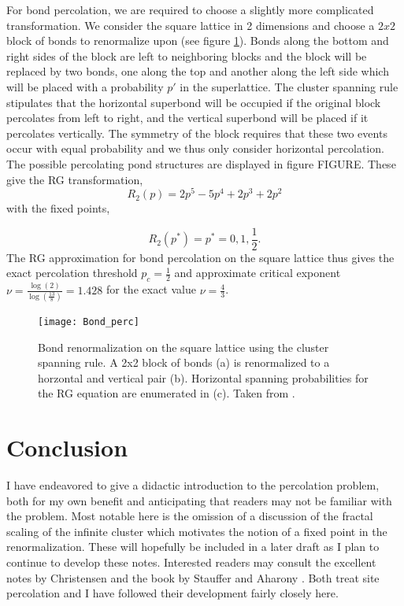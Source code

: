 For bond percolation, we are required to choose a slightly more complicated
transformation.  We consider the square lattice in 2 dimensions and choose
a $2x2$ block of bonds to renormalize upon (see figure \ref{fig:bond_renorm}).
  Bonds along the bottom and right sides
of the block are left to neighboring blocks and the block will be replaced by
two bonds, one along the top and another along the left side which will be
placed with a probability $p'$ in the superlattice.  The cluster spanning rule
stipulates that the horizontal superbond will be occupied if the original
block percolates from left to right, and the vertical superbond will be placed
if it percolates vertically.  The symmetry of the block requires that these
two events occur with equal probability and we thus only consider
horizontal percolation.  The possible percolating pond structures are displayed
in figure FIGURE.  These give the RG transformation,
\[R_2(p) = 2p^5 - 5p^4 + 2p^3 + 2p^2\]
with the fixed points,

\[R_2(p^*) = p^* = 0, 1, \frac{1}{2}.\]
The RG approximation for bond percolation on the square lattice thus gives
the exact percolation threshold $p_c = \frac{1}{2}$ and approximate 
critical exponent $\nu = \frac{\log(2)}{\log(\frac{13}{8})} = 1.428$ for
the exact value $\nu=\frac{4}{3}$.
\begin{figure}[h]
  \centering
    \texttt{[image: Bond\_perc]}
  \caption{Bond renormalization on the square lattice using the cluster spanning rule. A 2x2
           block of bonds (a) is renormalized to a horzontal and vertical pair (b).  Horizontal spanning
           probabilities for the RG equation are enumerated in (c). Taken from \cite{Stauffer1994}.}
  \label{fig:bond_renorm}
\end{figure}
\section{Conclusion}

I have endeavored to give a didactic introduction to the percolation problem, both for my own benefit
and anticipating that readers may not be familiar with the problem.  Most notable here is the omission
of a discussion of the fractal scaling of the infinite cluster which motivates the notion of a
fixed point in the renormalization.  These will hopefully be included in a later draft as I plan
to continue to develop these notes.  Interested readers may consult the excellent notes by Christensen \cite{Christensen2002}
and the book by Stauffer and Aharony \cite{Stauffer1994}.  Both treat site percolation and I have followed their
development fairly closely here.


